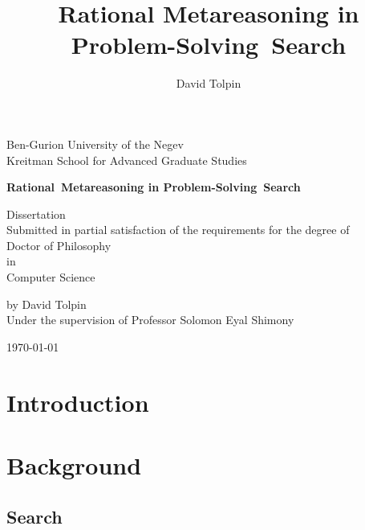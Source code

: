 \documentclass[oneside]{report}
\title {Rational Metareasoning in Problem-Solving~Search}
\author {David Tolpin}
\begin{document}
\begin{titlepage}
\begin{center}
{\large Ben-Gurion University of the Negev
\\
Kreitman School for Advanced Graduate Studies}
\vspace{1in}

{\bf\LARGE Rational~Metareasoning in Problem-Solving~Search}
\vspace{1in}

{\large Dissertation\\
Submitted in partial satisfaction of the requirements for the degree of\\
Doctor of Philosophy\\
in\\
Computer Science
\\
\vspace{1in}

by David Tolpin
\\
Under the supervision of Professor Solomon Eyal Shimony
\\
\vfill

\today}

\vspace{1in}

\end{center}
\end{titlepage}


\setcounter{page}{1}



\setcounter{tocdepth}{5}
\tableofcontents

\newpage
\setcounter{page}{1}

\chapter{Introduction}
\label{ch:intro}


\chapter{Background}
\label{ch:bg}

\section{Search}
\label{sec:search}

\end{document}

